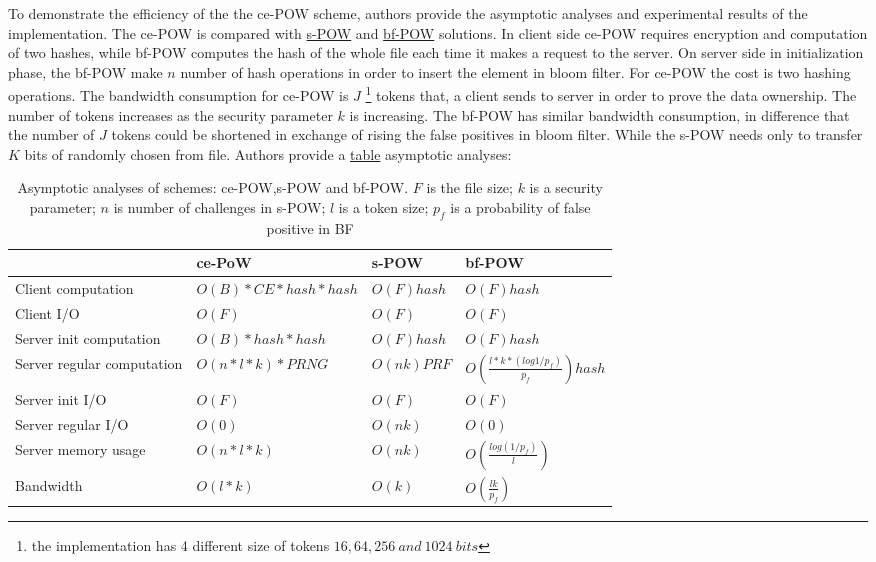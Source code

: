 \documentclass[12pt]{article}
\begin{document}
To demonstrate the efficiency of the the ce-POW scheme, authors provide the asymptotic  analyses and experimental results of the implementation. The ce-POW is compared with \hyperref[sub:Soltuion2]{s-POW} and \hyperref[sub:Soltuion6]{bf-POW} solutions. In client side ce-POW requires encryption and computation of two hashes, while bf-POW computes the hash of the whole file each time it makes a request to the server. On server side  in initialization phase, the bf-POW make $n$ number of hash operations in order to insert the element in bloom filter. For ce-POW the  cost is  two hashing operations. The bandwidth consumption for ce-POW is $J$ \footnote{ the implementation has 4 different size of tokens $16, 64, 256\ and\  1024\ bits$} tokens that, a client sends to server in order to prove the data ownership. The number of tokens increases as the security parameter $k$ is increasing. The bf-POW has  similar  bandwidth consumption, in difference that the number of $J$ tokens could be  shortened in exchange of rising the false positives in bloom filter. While the s-POW needs only to transfer $K$ bits of randomly chosen from file. Authors provide a \hyperref[table:asymptoticAnalysisCE-POW]{table}  asymptotic analyses:


\begin{savenotes}
\begin{table}[!htpb]
\centering
\addtolength{\tabcolsep}{3pt}
\begin{tabular}{|L{4cm}|L{4cm}|L{2.5cm}|L{3.5cm}|}
\hline
&ce-PoW&s-POW&bf-POW\\
\hline
Client computation&$O(B)*CE*hash*hash$ & $O(F)hash$ & $O(F)hash$ \\
\hline
Client I/O&$O(F)$&$O(F)$&$O(F)$\\
\hline
Server init computation &$O(B)*hash*hash$&$O(F) hash$&$O(F)hash$\\
\hline
Server regular computation &$O(n * l *k)*PRNG$&$O(nk) PRF$& $O(\frac{l*k*(log1/p_f)}{p_f})hash$\\
\hline
Server init I/O &$O(F)$&$O(F)$&$O(F)$\\
\hline
Server regular I/O &$O(0)$&$O(nk)$&$O(0)$\\
\hline
Server memory usage&$O(n * l *k)$&$O(nk)$&$O(\frac{log(1/p_f)}{l})$\\
\hline
Bandwidth&$O(l *k)$&$O(k)$&$O(\frac{lk}{p_f})$\\
\hline
\end{tabular}
\caption{Asymptotic analyses of schemes: ce-POW,s-POW and bf-POW. $F$ is the file size; $k$ is a security parameter; $n$ is number of challenges in s-POW;  $l$ is a token size; $p_f$ is a probability of false positive in BF}
\label{table:asymptoticAnalysisCE-POW}
\end{table}
\end{savenotes}
\end{document}

